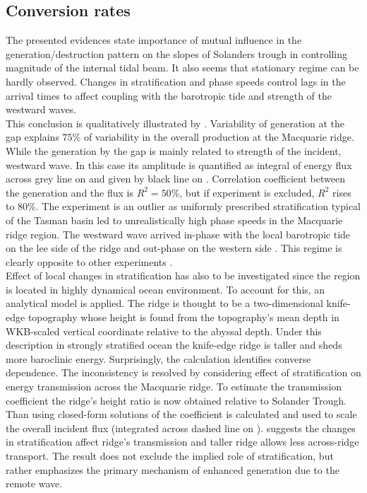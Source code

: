 \documentclass[12pt]{article}
\begin{document}
\subsection{Conversion rates}
The presented evidences state importance of mutual influence in the generation/destruction 
pattern on the slopes of Solanders trough in controlling magnitude of the internal tidal beam. It 
also seems that stationary regime can be hardly observed. Changes in stratification and phase 
speeds control lags in the arrival times to affect coupling with the barotropic tide and strength 
of the westward waves.\\

This conclusion is qualitatively illustrated by . Variability of 
generation at the gap explains $75\%$ of variability in the overall production at the Macquarie 
ridge. While the generation by the gap is mainly related to strength of the incident, westward 
wave. In this case its amplitude is quantified as integral of energy flux across grey line on 
 and given by black line on . Correlation 
coefficient between the generation and the flux is $R^2 = 50\%$, but if  experiment is 
excluded, $R^2$ rises to $80\%$. The  experiment is an outlier as uniformly prescribed 
stratification typical of the Tasman basin led to unrealistically high phase speeds in the 
Macquarie ridge region. The westward wave arrived in-phase with the local barotropic tide on the 
lee side of the ridge and out-phase on the western side . This regime is 
clearly opposite to other experiments .\\

Effect of local changes in stratification has also to be investigated since the region is located 
in highly dynamical ocean environment.  To account for this, an analytical model 
\citep{st2003generation} is applied. The ridge is thought to be a two-dimensional knife-edge 
topography whose height is found from the topography's mean depth in WKB-scaled vertical coordinate 
\citep{althaus2003internal} relative to the abyssal depth. Under this description in strongly 
stratified ocean the knife-edge ridge is taller and sheds more baroclinic energy. Surprisingly, the 
calculation  identifies converse dependence. The inconsistency is 
resolved by considering effect of stratification on energy transmission across the Macquarie ridge. 
To estimate the transmission coefficient the ridge's height ratio is now obtained relative to 
Solander Trough. Than using closed-form solutions of \citep{larsen1969internal} the coefficient is 
calculated and used to scale the overall incident flux (integrated across dashed line on 
).  suggests the changes in stratification 
affect ridge's transmission and taller ridge allows less across-ridge transport. The result does 
not exclude the implied role of stratification, but rather emphasizes the primary mechanism of 
enhanced generation due to the remote wave.\\
\end{document}
